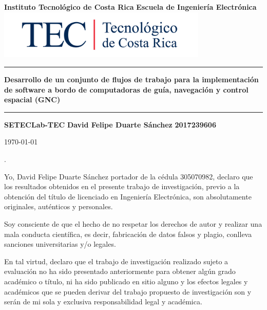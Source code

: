 \documentclass[12pt]{article}
\begin{document}
\begin{titlepage}

  \centering
  \vspace{10cm}
  \textbf{\LARGE Instituto Tecnológico de Costa Rica}
  \vspace{2cm}
  \textbf{\LARGE Escuela de Ingeniería Electrónica}
  \vspace{2cm}
  \includegraphics[width=10cm]{logotec/image.png}
  \vspace{2cm}
  \hrule
  \vspace{1cm}
  \textbf{\LARGE Desarrollo de un conjunto de flujos de trabajo para la implementación de software a bordo de computadoras de guía, navegación y control espacial (GNC)}
  \vspace{1cm}
  \hrule
  \vspace{1cm}
  \textbf{\LARGE SETECLab-TEC}
  \vspace{1cm}
  \textbf{\LARGE David Felipe Duarte Sánchez}
  \vspace{1cm}
  \textbf{\LARGE 2017239606}

  \vspace{1cm}
  \today %
\end{titlepage}
.
\par
\vspace{16cm} %

Yo, David Felipe Duarte Sánchez portador de la cédula 305070982, declaro que los resultados obtenidos en el presente trabajo de investigación, previo a la obtención del título de licenciado en Ingeniería Electrónica, son absolutamente originales, auténticos y personales.

Soy consciente de que el hecho de no respetar los derechos de autor y realizar una mala conducta científica, es decir, fabricación de datos falsos y plagio, conlleva sanciones universitarias y/o legales.

En tal virtud, declaro que el trabajo de investigación realizado sujeto a evaluación no ha sido presentado anteriormente para obtener algún grado académico o título, ni ha sido publicado en sitio alguno y los efectos legales y académicos que se pueden derivar del trabajo propuesto de investigación son y serán de mi sola y exclusiva responsabilidad legal y académica.
\end{document}
